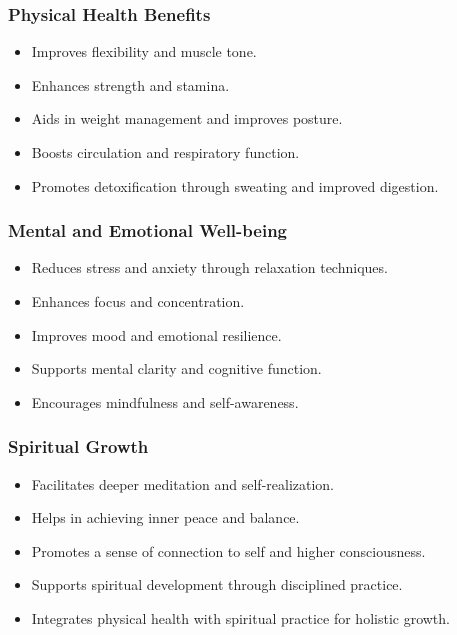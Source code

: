 \begin{frame}[fragile]\frametitle{Physical Health Benefits}

      \begin{itemize}
		\item Improves flexibility and muscle tone.
		\item Enhances strength and stamina.
		\item Aids in weight management and improves posture.
		\item Boosts circulation and respiratory function.
		\item Promotes detoxification through sweating and improved digestion.
	  \end{itemize}

\end{frame}

\begin{frame}[fragile]\frametitle{Mental and Emotional Well-being}

      \begin{itemize}
		\item Reduces stress and anxiety through relaxation techniques.
		\item Enhances focus and concentration.
		\item Improves mood and emotional resilience.
		\item Supports mental clarity and cognitive function.
		\item Encourages mindfulness and self-awareness.
	  \end{itemize}

\end{frame}

\begin{frame}[fragile]\frametitle{Spiritual Growth}

      \begin{itemize}
		\item Facilitates deeper meditation and self-realization.
		\item Helps in achieving inner peace and balance.
		\item Promotes a sense of connection to self and higher consciousness.
		\item Supports spiritual development through disciplined practice.
		\item Integrates physical health with spiritual practice for holistic growth.
	  \end{itemize}

\end{frame}

